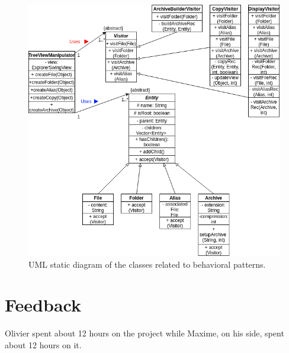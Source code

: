 \documentclass[a4paper, 11pt, oneside]{article}
\begin{document}
\begin{figure}[H]
    \centering
    \includegraphics[scale=0.6]{behavioral.png}
    \caption{UML static diagram of the classes related to behavioral patterns.}\label{fig:behavioral}
\end{figure}

\section{Feedback}

Olivier spent about 12 hours on the project while Maxime, on his side, spent about 12 hours on it.
\end{document}
